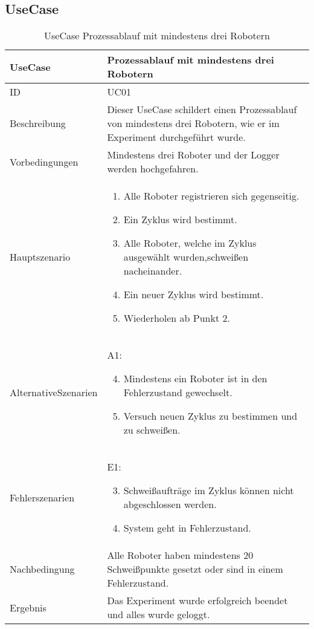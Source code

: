 \subsection{UseCase}
\begin{table}[h!]
\begin{center}
\begin{tabular}{ |p{2.8cm}|p{11cm}| } 
 \hline
 UseCase & Prozessablauf mit mindestens drei Robotern \\
 \hline
 ID & UC01 \\
 \hline
 Beschreibung & Dieser UseCase schildert einen Prozessablauf von mindestens drei Robotern, wie
 er im Experiment durchgeführt wurde. \\
 \hline
 Vorbedingungen & Mindestens drei Roboter und der Logger werden hochgefahren.\\
 \hline
 Hauptszenario & 
 \begin{enumerate}
  \item Alle Roboter registrieren sich gegenseitig.
  \item Ein Zyklus wird bestimmt.
  \item Alle Roboter, welche im Zyklus ausgewählt wurden,\newline schweißen nacheinander.
  \item Ein neuer Zyklus wird bestimmt.
  \item Wiederholen ab Punkt 2.
 \end{enumerate} \\
 \hline
 Alternative\newline Szenarien &
 A1: \newline
 \begin{enumerate}
  \setcounter{enumi}{3}
  \item Mindestens ein Roboter ist in den Fehlerzustand gewechselt.
  \item Versuch neuen Zyklus zu bestimmen und zu schweißen.
 \end{enumerate}  \\
 \hline
 Fehlerszenarien & 
 E1: \newline
 \begin{enumerate}
   \setcounter{enumi}{2}
   \item Schweißaufträge im Zyklus können nicht abgeschlossen werden.
   \item System geht in Fehlerzustand.
 \end{enumerate} \\
 \hline
 Nachbedingung & Alle Roboter haben mindestens 20 Schweißpunkte gesetzt oder sind in einem Fehlerzustand. \\
 \hline
 Ergebnis & Das Experiment wurde erfolgreich beendet und alles wurde geloggt. \\ 
 \hline
\end{tabular}
\caption{UseCase Prozessablauf mit mindestens drei Robotern}
\label{table:usecase1}
\end{center}
\end{table}
